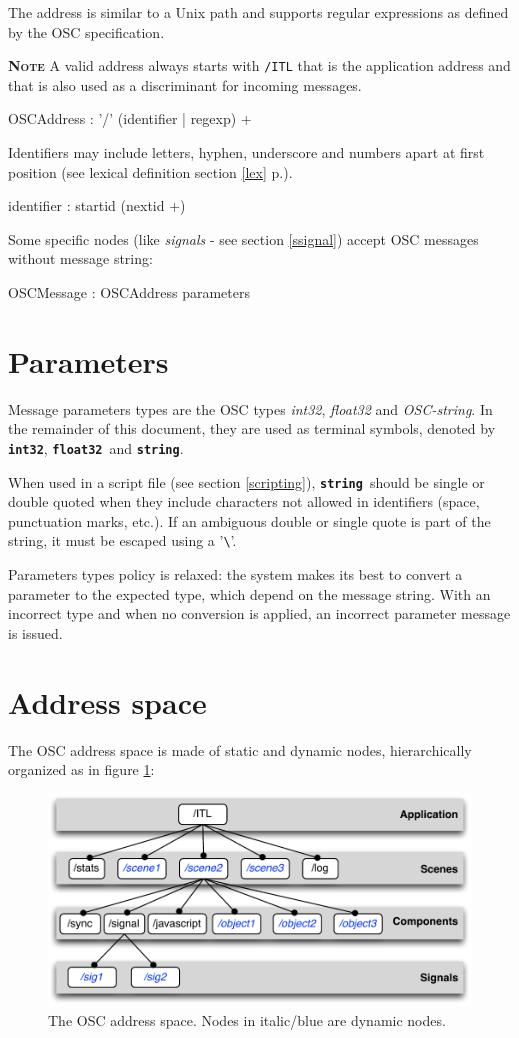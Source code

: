 \documentclass[a4paper,twoside]{report}
\newcommand{\sublevel}[1]	{\section{#1}}
\newcommand{\fullref}[1]	{\ref{#1} p.\pageref{#1}}
\newcommand{\OSC}[1]		{\texttt{#1}}
\newcommand{\note}	[1]		{\vspace{2mm}\textbf{\hspace{-1.03cm}\textbf{\textsc{Note #1}}}}
\newcommand{\osctype}[1]	{\textbf{\texttt{{\small #1}}}}
\newcommand{\oscint}		{\osctype{int32}}
\newcommand{\oscfloat}	{\osctype{float32}}
\newcommand{\oscstring}	{\osctype{string}}
\begin{document}
The address is similar to a Unix path and supports regular expressions as defined by the OSC specification. 

\note{} A valid address always starts with \OSC{/ITL} that is the application address and that is also used as a discriminant for incoming messages.
\begin{rail}
OSCAddress : '/' (identifier | regexp) +
\end{rail}

Identifiers may include letters, hyphen, underscore and numbers apart at first position (see lexical definition section \fullref{lex}).
\railalias{nextid}{[-\_a-zA-Z0-9]]}
\begin{rail}
identifier : startid (nextid +)
\end{rail}

Some specific nodes (like \emph{signals} - see section \ref{ssignal}) accept OSC messages without message string:
\begin{rail}
OSCMessage : OSCAddress parameters
\end{rail}

\sublevel{Parameters}

Message parameters types are the OSC types \emph{int32}, \emph{float32} and \emph{OSC-string}. In the remainder of this document, they are used as terminal symbols, denoted by \oscint, \oscfloat\ and \oscstring. 

When used in a script file (see section \ref{scripting}), \oscstring\ should be single or double quoted when they include characters not allowed in identifiers (space, punctuation marks, etc.).
If an ambiguous double or single quote is part of the string, it must be escaped using a '\verb+\+'.

Parameters types policy is relaxed: the system makes its best to convert a parameter to the expected type, which depend on the message string. With an incorrect type and when no conversion is applied, an incorrect parameter message is issued.

\sublevel{Address space}
The OSC address space is made of static and dynamic nodes, hierarchically organized as in figure \ref{fig:addrspace}:

\begin{figure}[h]
	\centering \includegraphics[width=120mm]{imgs/address_space}
 \caption{The OSC address space. Nodes in italic/blue are dynamic nodes.}
 \label{fig:addrspace}
\end{figure}
\end{document}
